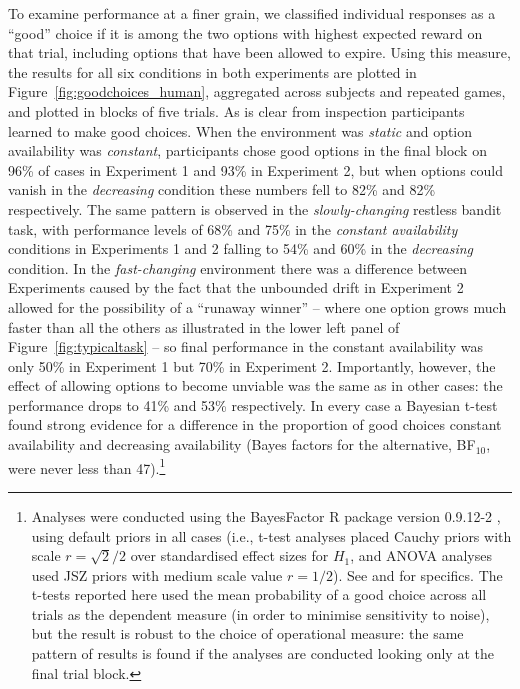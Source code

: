 \documentclass[a4paper,doc,natbib]{apa6}
\begin{document}
To examine performance at a finer grain, we classified individual responses as a ``good'' choice if it is among the two options with highest expected reward on that trial, including options that have been allowed to expire. Using this measure, the results for all six conditions in both experiments are plotted in Figure~\ref{fig:goodchoices_human}, aggregated across subjects and repeated games, and plotted in blocks of five trials. As is clear from inspection participants learned to make good choices. When the environment was \textit{static} and option availability was \textit{constant}, participants chose good options in the final block on 96\% of cases in Experiment 1 and 93\% in Experiment 2, but when options could vanish in the \textit{decreasing} condition these numbers fell to 82\% and 82\% respectively. The same pattern is observed in the \textit{slowly-changing} restless bandit task, with performance levels of 68\% and 75\% in the \textit{constant availability} conditions in Experiments 1 and 2 falling to 54\% and 60\% in the \textit{decreasing} condition. In the \textit{fast-changing} environment there was a difference between Experiments caused by the fact that the unbounded drift in Experiment 2 allowed for the possibility of a ``runaway winner'' -- where one option grows much faster than all the others as illustrated in the lower left panel of Figure~\ref{fig:typicaltask} --  so final performance in the constant availability was only 50\% in Experiment 1 but 70\% in Experiment 2. Importantly, however, the effect of allowing options to become unviable was the same as in other cases: the performance drops to 41\% and 53\% respectively. In every case a Bayesian t-test found strong evidence for a difference in the proportion of good choices constant availability and decreasing availability (Bayes factors for the alternative, BF$_{10}$, were never less than 47).\footnote{Analyses were conducted using the BayesFactor R package version 0.9.12-2 \citep{morey2015bayesfactor}, using default priors in all cases (i.e., t-test analyses placed Cauchy priors with scale $r=\sqrt{2}/2$ over standardised effect sizes for $H_1$, and ANOVA analyses used JSZ priors with medium scale value $r=1/2$). See \protect\citet{rouder2009bayesian} and \protect\citet{rouder2012default} for specifics. The t-tests reported here used the mean probability of a good choice across all trials as the dependent measure (in order to minimise sensitivity to noise), but the result is robust to the choice of operational measure: the same pattern of results is found if the analyses are conducted looking only at the final trial block.}
\end{document}
